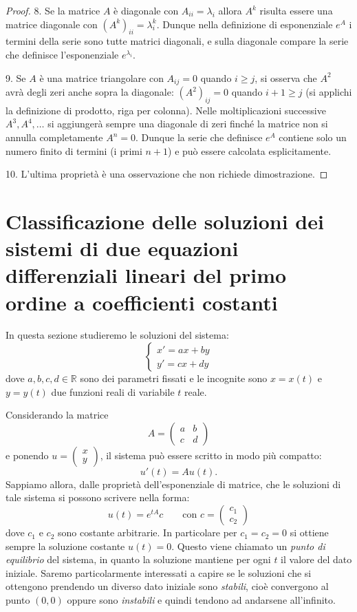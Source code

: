 \documentclass[italian,a4paper]{scrartcl}
\newcommand{\RR}{{\mathbb R}}
\begin{document}
\begin{theorem}
\begin{proof}
8. Se la matrice $A$ è diagonale con $A_{ii}=\lambda_i$ allora $A^k$
risulta essere una matrice diagonale con $(A^k)_{ii} =
\lambda_i^k$. Dunque nella definizione di esponenziale $e^A$ i termini
della serie sono tutte matrici diagonali, e sulla diagonale compare la
serie che definisce l'esponenziale $e^{\lambda_i}$.

9. Se $A$ è una matrice triangolare con $A_{ij}=0$ quando $i\ge j$, si
osserva che $A^2$ avrà degli zeri anche sopra la diagonale:
$(A^2)_{ij}=0$ quando $i+1\ge j$ (si applichi la definizione di
prodotto, riga per colonna). Nelle moltiplicazioni successive $A^3,
A^4,\dots$ si aggiungerà sempre una diagonale di zeri finché la matrice non
si annulla completamente $A^n=0$. Dunque la serie che definisce $e^A$
contiene solo un numero finito di termini (i primi $n+1$) e può essere
calcolata esplicitamente.

10. L'ultima proprietà è una osservazione che non richiede dimostrazione.
\end{proof}
\end{theorem}

\section{Classificazione delle soluzioni dei sistemi di due equazioni
  differenziali lineari del primo ordine a coefficienti costanti}

In questa sezione studieremo le soluzioni del sistema:
\[
\begin{cases}
 x' = a x + b y\\
 y' = c x + d y
\end{cases}
\]
dove $a,b,c,d\in \RR$ sono dei parametri fissati e le incognite sono
$x=x(t)$ e $y=y(t)$ due funzioni reali di variabile $t$ reale.

Considerando la matrice
\[
A = \begin{pmatrix}
a & b \\
c & d
\end{pmatrix}
\]
e ponendo $u = \begin{pmatrix}x\\y\end{pmatrix}$, il sistema può essere scritto in modo più
compatto:
\[
 u'(t) = A u(t).
\]
Sappiamo allora, dalle proprietà dell'esponenziale di matrice, che le
soluzioni di tale sistema si possono scrivere nella forma:
\[
 u(t) = e^{tA}c \qquad \text{con } c=\begin{pmatrix}c_1\\c_2\end{pmatrix}
\]
dove $c_1$ e $c_2$ sono costante arbitrarie. In particolare per $c_1=c_2=0$ si
ottiene sempre la soluzione costante $u(t)=0$. Questo viene chiamato un \emph{punto
  di equilibrio} del sistema, in quanto la soluzione mantiene per ogni
$t$ il valore del dato iniziale.
Saremo particolarmente interessati a
capire se le soluzioni che si ottengono prendendo un diverso dato iniziale
sono \emph{stabili},
cioè convergono al punto $(0,0)$ oppure sono \emph{instabili} e quindi
tendono ad andarsene all'infinito.
\end{document}
